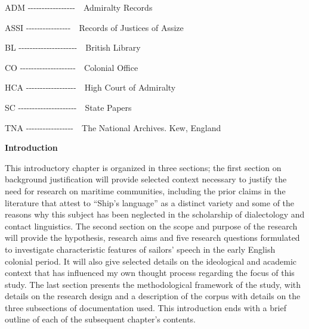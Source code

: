 \begin{styleStandard}
ADM -{}-{}-{}-{}-{}-{}-{}-{}-{}-{}-{}-{}-{}-{}-{}-{}-\ \ Admiralty Records
\end{styleStandard}

\begin{styleStandard}
ASSI -{}-{}-{}-{}-{}-{}-{}-{}-{}-{}-{}-{}-{}-{}-{}-\ \ Records of Justices of Assize
\end{styleStandard}

\begin{styleStandard}
BL -{}-{}-{}-{}-{}-{}-{}-{}-{}-{}-{}-{}-{}-{}-{}-{}-{}-{}-{}-{}-\ \ British Library
\end{styleStandard}

\begin{styleStandard}
CO -{}-{}-{}-{}-{}-{}-{}-{}-{}-{}-{}-{}-{}-{}-{}-{}-{}-{}-{}-\ \ Colonial Office
\end{styleStandard}

\begin{styleStandard}
HCA -{}-{}-{}-{}-{}-{}-{}-{}-{}-{}-{}-{}-{}-{}-{}-{}-{}-\ \ High Court of Admiralty
\end{styleStandard}

\begin{styleStandard}
SC -{}-{}-{}-{}-{}-{}-{}-{}-{}-{}-{}-{}-{}-{}-{}-{}-{}-{}-{}-{}-\ \ State Papers
\end{styleStandard}

\begin{styleStandard}
TNA -{}-{}-{}-{}-{}-{}-{}-{}-{}-{}-{}-{}-{}-{}-{}-{}-\ \ The National Archives. Kew, England
\end{styleStandard}


\setcounter{listWWNumxvleveli}{0}
\begin{listWWNumxvleveli}
\item 
\clearpage\begin{styleNormali}
\textbf{Introduction}
\end{styleNormali}
\end{listWWNumxvleveli}
\begin{styleNormali}
This introductory chapter is organized in three sections; the first section on background justification will provide selected context necessary to justify the need for research on maritime communities, including the prior claims in the literature that attest to “Ship’s language” as a distinct variety and some of the reasons why this subject has been neglected in the scholarship of dialectology and contact linguistics. The second section on the scope and purpose of the research will provide the\textbf{ }hypothesis, research aims and five research questions formulated to investigate characteristic features of sailors’ speech in the early English colonial period. It will also give selected details on the ideological and academic context that has influenced my own thought process regarding the focus of this study. The last section presents the methodological framework of the study, with details on the research design and a description of the corpus with details on the three subsections of documentation used. This introduction ends with a brief outline of each of the subsequent chapter’s contents.
\end{styleNormali}

